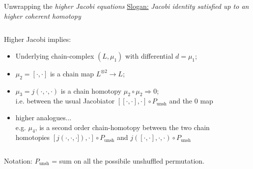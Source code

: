 \documentclass[beamer,10pt]{standalone}
\begin{document}
\begin{frame}{Unwrapping the \emph{higher Jacobi equations}}\label{Frame:unwapping-Jacobi}
\underline{Slogan:} \emph{Jacobi identity satisfied up to an higher coherent homotopy}
		\vspace{1.5em}
		\begin{columns}[c]
			\hfill
			\begin{column}{0.5\linewidth}
				Higher Jacobi implies:
				\begin{itemize}  \setlength\itemsep{1em}
					\item Underlying chain-complex $(L,\mu_1)$ with differential $d=\mu_1$;
					\item \color{red} $\mu_2 = [\cdot,\cdot]$ is a chain map $L^{\otimes 2} \to L$;
					\item \color{green!20!black}$\mu_3=j(\cdot,\cdot,\cdot)$ is a chain homotopy 
						$\mu_2\circ\mu_2 \Rightarrow 0$;
						\\ i.e. between the usual Jacobiator ${[[\cdot,\cdot],\cdot]} \circ P_{\text{unsh}}$ and the $0$ map 
					\item \color{purple}higher analogues...	
					\\ e.g. $\mu_4$, is a second order chain-homotopy between the two chain homotopies  ${[j(\cdot,\cdot ,\cdot]),\cdot]}\circ P_{\text{unsh}}$ and ${j([\cdot , \cdot],\cdot,\cdot)}\circ P_{\text{unsh}}$
				\end{itemize}
			\end{column}
			\begin{column}{0.45\linewidth}
				
			\end{column}	
		\end{columns}	
		\vspace{1.5em}
		Notation: $P_{\text{unsh}}$ = sum on all the possibile unshuffled permutation.

\end{frame}
\end{document}
